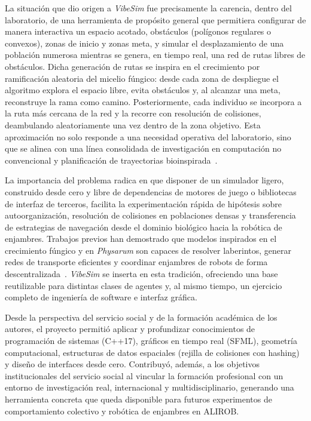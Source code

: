 \documentclass[12pt,a4paper]{article}
\begin{document}
La situación que dio origen a \emph{VibeSim} fue precisamente la carencia, dentro del laboratorio, de una herramienta de propósito general que permitiera configurar de manera interactiva un espacio acotado, obstáculos (polígonos regulares o convexos), zonas de inicio y zonas meta, y simular el desplazamiento de una población numerosa mientras se genera, en tiempo real, una red de rutas libres de obstáculos. Dicha generación de rutas se inspira en el crecimiento por ramificación aleatoria del micelio fúngico: desde cada zona de despliegue el algoritmo explora el espacio libre, evita obstáculos y, al alcanzar una meta, reconstruye la rama como camino. Posteriormente, cada individuo se incorpora a la ruta más cercana de la red y la recorre con resolución de colisiones, deambulando aleatoriamente una vez dentro de la zona objetivo. Esta aproximación no solo responde a una necesidad operativa del laboratorio, sino que se alinea con una línea consolidada de investigación en computación no convencional y planificación de trayectorias bioinspirada~\cite{adamatzky2012maze,jones2015morphological,luo2021swarm,tian2023slime}.

La importancia del problema radica en que disponer de un simulador ligero, construido desde cero y libre de dependencias de motores de juego o bibliotecas de interfaz de terceros, facilita la experimentación rápida de hipótesis sobre autoorganización, resolución de colisiones en poblaciones densas y transferencia de estrategias de navegación desde el dominio biológico hacia la robótica de enjambres. Trabajos previos han demostrado que modelos inspirados en el crecimiento fúngico y en \emph{Physarum} son capaces de resolver laberintos, generar redes de transporte eficientes y coordinar enjambres de robots de forma descentralizada~\cite{adamatzky2012maze,luo2021swarm,scientificreports2025physarum}. \emph{VibeSim} se inserta en esta tradición, ofreciendo una base reutilizable para distintas clases de agentes y, al mismo tiempo, un ejercicio completo de ingeniería de software e interfaz gráfica.

Desde la perspectiva del servicio social y de la formación académica de los autores, el proyecto permitió aplicar y profundizar conocimientos de programación de sistemas (C++17), gráficos en tiempo real (SFML), geometría computacional, estructuras de datos espaciales (rejilla de colisiones con hashing) y diseño de interfaces desde cero. Contribuyó, además, a los objetivos institucionales del servicio social al vincular la formación profesional con un entorno de investigación real, internacional y multidisciplinario, generando una herramienta concreta que queda disponible para futuros experimentos de comportamiento colectivo y robótica de enjambres en ALIROB.
\end{document}
